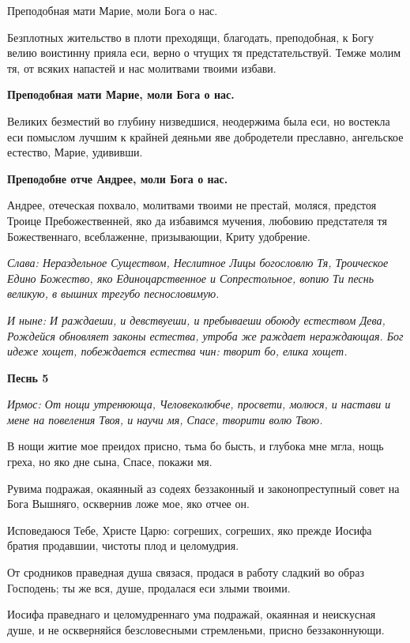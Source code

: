 Преподобная мати Марие, моли Бога о нас.\normalfont{}


Безплотных жительство в плоти преходящи, благодать, преподобная, к Богу велию воистинну прияла еси, верно о чтущих тя предстательствуй. Темже молим тя, от всяких напастей и нас молитвами твоими избави.


\bfseries Преподобная мати Марие, моли Бога о нас.\normalfont{}


Великих безместий во глубину низведшися, неодержима была еси, но востекла еси помыслом лучшим к крайней деяньми яве добродетели преславно, ангельское естество, Марие, удививши.


\bfseries Преподобне отче Андрее, моли Бога о нас.\normalfont{}


Андрее, отеческая похвало, молитвами твоими не престай, моляся, предстоя Троице Пребожественней, яко да избавимся мучения, любовию предстателя тя Божественнаго, всеблаженне, призывающии, Криту удобрение.


\itshape Слава\normalfont{}: Нераздельное Существом, Неслитное Лицы богословлю Тя, Троическое Едино Божество, яко Единоцарственное и Сопрестольное, вопию Ти песнь великую, в вышних трегубо песнословимую.


\itshape И ныне\normalfont{}: И раждаеши, и девствуеши, и пребываеши обоюду естеством Дева, Рождейся обновляет законы естества, утроба же раждает нераждающая. Бог идеже хощет, побеждается естества чин: творит бо, елика хощет. 


\medskip
\bfseries Песнь 5\normalfont{}


\itshape Ирмос\normalfont{}: От нощи утренююща, Человеколюбче, просвети, молюся, и настави и мене на повеления Твоя, и научи мя, Спасе, творити волю Твою.


В нощи житие мое преидох присно, тьма бо бысть, и глубока мне мгла, нощь греха, но яко дне сына, Спасе, покажи мя.


Рувима подражая, окаянный аз содеях беззаконный и законопреступный совет на Бога Вышняго, осквернив ложе мое, яко отчее он.


Исповедаюся Тебе, Христе Царю: согреших, согреших, яко прежде Иосифа братия продавшии, чистоты плод и целомудрия.


От сродников праведная душа связася, продася в работу сладкий во образ Господень; ты же вся, душе, продалася еси злыми твоими.


Иосифа праведнаго и целомудреннаго ума подражай, окаянная и неискусная душе, и не оскверняйся безсловесными стремленьми, присно беззаконнующи.


